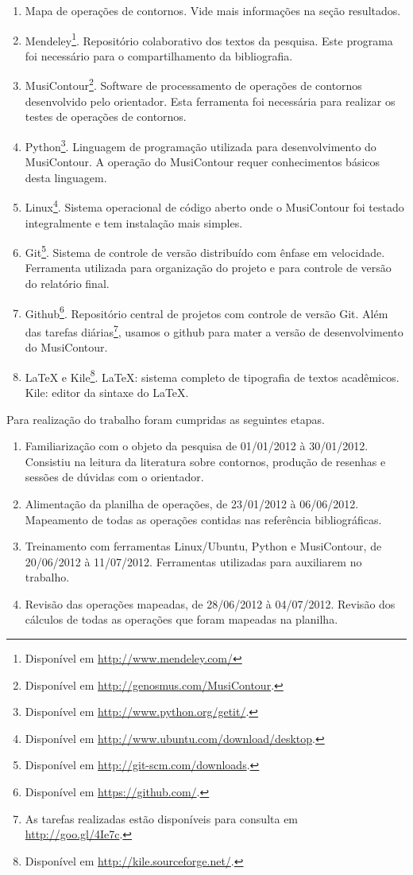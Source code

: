\documentclass[11pt]{article}
\begin{document}
\begin{enumerate}
\item Mapa de operações de contornos. Vide mais
  informações na seção resultados.
\item Mendeley\footnote{Disponível em
    \url{http://www.mendeley.com/}}. Repositório colaborativo dos
  textos da pesquisa. Este programa foi necessário para o
  compartilhamento da bibliografia.
\item MusiContour\footnote{Disponível em
    \url{http://genosmus.com/MusiContour}.}. Software de processamento
  de operações de contornos desenvolvido pelo orientador. Esta
  ferramenta foi necessária para realizar os testes de operações de
  contornos.
\item Python\footnote{Disponível em
    \url{http://www.python.org/getit/}.}. Linguagem de programação
  utilizada para desenvolvimento do MusiContour. A operação do
  MusiContour requer conhecimentos básicos desta linguagem.
\item Linux\footnote{Disponível em
  \url{http://www.ubuntu.com/download/desktop}.}. Sistema operacional
  de código aberto onde o MusiContour foi testado integralmente e
  tem instalação mais simples.
\item Git\footnote{Disponível em
    \url{http://git-scm.com/downloads}.}. Sistema de controle de
  versão distribuído com ênfase em velocidade. Ferramenta utilizada
  para organização do projeto e para controle de versão do relatório
  final.
\item Github\footnote{Disponível em
    \url{https://github.com/}.}. Repositório central de projetos com
  controle de versão Git.
  Além das tarefas diárias\footnote{As tarefas realizadas estão
    disponíveis para consulta em \url{http://goo.gl/4Ie7c}.}, usamos o
  github para mater a versão de desenvolvimento do MusiContour.
\item \LaTeX{} e Kile\footnote{Disponível em
  \url{http://kile.sourceforge.net/}.}. \LaTeX: sistema completo de tipografia
  de textos acadêmicos. Kile: editor da sintaxe do \LaTeX.
\end{enumerate}

Para realização do trabalho foram cumpridas as seguintes etapas.

\begin{enumerate}
\item Familiarização com o objeto da pesquisa de 01/01/2012 à 30/01/2012.
Consistiu na leitura da literatura sobre contornos, produção de resenhas
e sessões de dúvidas com o orientador.
\item Alimentação da planilha de operações, de 23/01/2012 à 06/06/2012.
Mapeamento de todas as operações contidas nas referência
bibliográficas.
\item Treinamento com ferramentas Linux/Ubuntu, Python e MusiContour, de 20/06/2012 à 11/07/2012.
Ferramentas utilizadas para auxiliarem no trabalho.
\item Revisão das operações mapeadas, de 28/06/2012 à 04/07/2012.
Revisão dos cálculos de todas as operações que foram mapeadas na planilha.
\end{enumerate}
\end{document}
